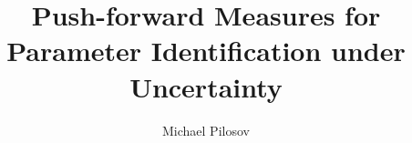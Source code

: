 \documentclass[final]{beamer}
\title{Push-forward Measures for Parameter Identification under Uncertainty}
\author{\color{black} Michael Pilosov}
\institute[shortinst]{\color{black} University of Colorado: Denver}
\newlength{\sepwidth}
\newlength{\colwidth}
\newcommand{\separatorcolumn}{\begin{column}{\sepwidth}\end{column}}
\begin{document}
\begin{frame}[t]
\begin{columns}[t]
\separatorcolumn

\begin{column}{\colwidth}

  




\end{column}


\separatorcolumn

\begin{column}{\colwidth}

  

  \vspace{-1cm}
  
  \vspace{-1cm}
  

\end{column}

\separatorcolumn

\begin{column}{\colwidth}


  
  

\end{column}

\separatorcolumn
\end{columns}
\end{frame}
\end{document}
